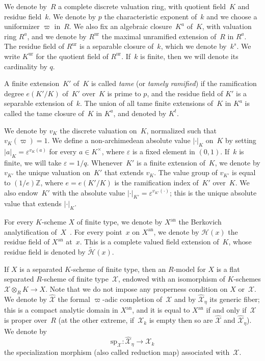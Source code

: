 \documentclass[JEP,XML,SOM,Unicode,NoFloatCountersInSection]{cedram}
\theoremstyle{definition}
\numberwithin{equation}{subsection}
\newcommand{\Z}{\ensuremath{\mathbb{Z}}}
\newcommand{\cX}{\ensuremath{\mathscr{X}}}
\newcommand{\an}{\mathrm{an}}
\newcommand{\spe}{\mathrm{sp}}
\newcommand{\ur}{\mathrm{ur}}
\let\unif\varpi
\begin{document}
We denote by~$R$ a complete discrete valuation ring, with quotient field~$K$ and residue field~$k$. We denote by $p$ the characteristic exponent of~$k$ and we choose a uniformizer $\unif$ in~$R$. We also fix an algebraic closure~$K^a$ of~$K$, with valuation ring $R^a$, and we denote by $R^{\ur}$ the maximal unramified extension of~$R$ in $R^{a}$.
The residue field of $R^{\ur}$ is a separable closure of~$k$, which we denote by~$k^s$. We write $K^{\ur}$ for the quotient field of $R^{\ur}$.
If~$k$ is finite, then we will denote its cardinality
by $q$.

A finite extension~$K'$ of~$K$ is called {\em tame} (or {\em tamely ramified}) if the ramification degree $e(K'/K)$ of~$K'$ over~$K$ is prime to $p$, and the residue field of
$K'$ is a separable extension of~$k$. The union of all tame finite extensions of~$K$ in $K^a$ is called the tame closure of~$K$ in $K^a$, and denoted by $K^t$.

We denote by $v_K$ the discrete valuation on~$K$, normalized such that $v_K(\unif)=1$. We define a non-archimedean absolute value $|\cdot|_K$ on~$K$ by setting
$|a|_K=\varepsilon^{v_K(a)}$ for every $a\in K^{\times}$, where $\varepsilon$ is a fixed element in $(0,1)$. If~$k$ is finite, we will take $\varepsilon=1/q$. Whenever~$K'$ is a finite extension of~$K$, we denote by $v_{K'}$ the unique valuation on~$K'$ that extends $v_K$. The value group of $v_{K'}$ is equal to $(1/e)\Z$, where $e=e(K'/K)$ is the ramification index of~$K'$ over~$K$.
We also endow~$K'$ with the absolute value $|\cdot|_{K'}=\varepsilon^{v_{K'}(\cdot)}$; this is the unique absolute value that extends $|\cdot|_K$.

For every $K$\nobreakdash-scheme $X$ of finite type, we denote by $X^{\an}$ the Berkovich analytification of~$X$~\cite{berk}. For every point~$x$ on $X^{\an}$, we denote by $\mathscr{H}(x)$ the residue field of $X^{\an}$ at~$x$. This is a complete valued field extension of~$K$, whose residue field is denoted by $\widetilde{\mathscr{H}}(x)$.

If $X$ is a separated $K$\nobreakdash-scheme of finite type, then an $R$\nobreakdash-model for $X$ is a flat separated $R$\nobreakdash-scheme of finite type~$\cX$, endowed with an isomorphism of $K$\nobreakdash-schemes $\cX\otimes_R K\to X$. Note that we do not impose any properness condition on $X$ or~$\cX$. We denote by $\widehat{\cX}$ the formal $\unif$-adic completion of~$\cX$ and by
$\widehat{\cX}_\eta$ its generic fiber; this is a compact analytic domain in $X^{\an}$, and it is equal to $X^{\an}$ if and only if~$\cX$ is proper over~$R$ (at the other extreme, if~$\cX_k$ is empty then so are $\widehat{\cX}$ and $\widehat{\cX}_\eta$). We denote by
\[
\spe_{\cX}:\widehat{\cX}_\eta\to \cX_k
\]
the specialization morphism (also called reduction map) associated with~$\cX$.
\end{document}
